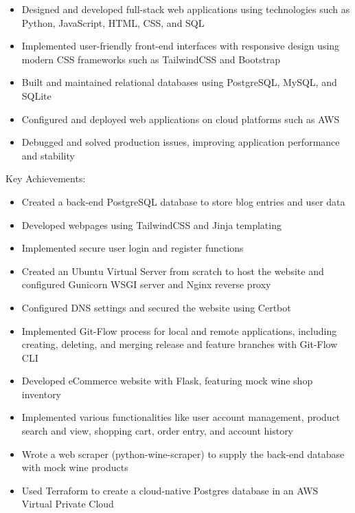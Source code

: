 \documentclass[
    10pt,
    A4,
    english,
    draft = false,
    twoside = false,
]{article}
\begin{document}
    {
    \begin{itemize}
      \item Designed and developed full-stack web applications using technologies such as Python,           JavaScript, HTML, CSS, and SQL
      \item Implemented user-friendly front-end interfaces with responsive design using modern CSS          frameworks such as TailwindCSS and Bootstrap
      \item Built and maintained relational databases using PostgreSQL, MySQL, and SQLite
      \item Configured and deployed web applications on cloud platforms such as AWS
      \item Debugged and solved production issues, improving application performance and stability
    \end{itemize}
    {Key Achievements:}
    \begin{itemize}
      \item Created a back-end PostgreSQL database to store blog entries and user data
      \item Developed webpages using TailwindCSS and Jinja templating
      \item Implemented secure user login and register functions
      \item Created an Ubuntu Virtual Server from scratch to host the website and configured Gunicorn WSGI server and Nginx reverse proxy
      \item Configured DNS settings and secured the website using Certbot
      \item Implemented Git-Flow process for local and remote applications, including creating, deleting, and merging release and feature branches with Git-Flow CLI
      \item Developed eCommerce website with Flask, featuring mock wine shop inventory
      \item Implemented various functionalities like user account management, product search and view, shopping cart, order entry, and account history
      \item  Wrote a web scraper (python-wine-scraper) to supply the back-end database with mock wine products
      \item Used Terraform to create a cloud-native Postgres database in an AWS Virtual Private Cloud
    \end{itemize}
    }
    
\end{document}

